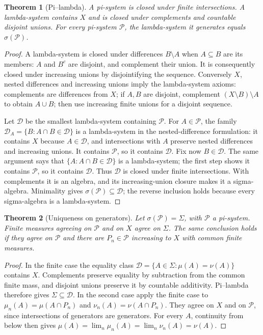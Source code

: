 \documentclass[11pt,oneside,openany]{book}
\newtheorem{theorem}{Theorem}[chapter]
\theoremstyle{definition}
\theoremstyle{remark}
\newcommand{\family}[1]{}
\begin{document}
\begin{theorem}[Pi--lambda]
\family{D11.01.pi_lambda}\label{d11:01:pi-lambda}
A pi-system is closed under finite intersections. A lambda-system contains
$X$ and is closed under complements and countable disjoint unions.
For every pi-system $\mathcal P$, the lambda-system it generates equals
$\sigma(\mathcal P)$.
\end{theorem}
\begin{proof}
A lambda-system is closed under differences $B\setminus A$ when $A\subseteq B$
are its members: $A$ and $B^c$ are disjoint, and complement their union.
It is consequently closed under increasing unions by disjointifying the
sequence. Conversely $X$, nested differences and increasing unions imply
the lambda-system axioms: complements are differences from $X$; if $A,B$
are disjoint, complement $(X\setminus B)\setminus A$ to obtain $A\cup B$;
then use increasing finite unions for a disjoint sequence.

Let $\mathcal D$ be the smallest lambda-system containing $\mathcal P$.
For $A\in\mathcal P$, the family
$\mathcal D_A=\{B:A\cap B\in\mathcal D\}$ is a lambda-system in the
nested-difference formulation: it contains $X$ because $A\in\mathcal D$,
and intersections with $A$ preserve nested differences and increasing unions.
It contains $\mathcal P$, so it contains $\mathcal D$. Fix now $B\in\mathcal D$.
The same argument says that $\{A:A\cap B\in\mathcal D\}$ is a lambda-system;
the first step shows it contains $\mathcal P$, so it contains $\mathcal D$.
Thus $\mathcal D$ is closed under finite intersections. With complements it
is an algebra, and its increasing-union closure makes it a sigma-algebra.
Minimality gives $\sigma(\mathcal P)\subseteq\mathcal D$; the reverse
inclusion holds because every sigma-algebra is a lambda-system.
\end{proof}

\begin{theorem}[Uniqueness on generators]
\family{D11.01.measure_uniqueness_generators}\label{d11:01:measure-uniqueness-generators}
Let $\sigma(\mathcal P)=\Sigma$, with $\mathcal P$ a pi-system. Finite
measures agreeing on $\mathcal P$ and on $X$ agree on $\Sigma$.
The same conclusion holds if they agree on $\mathcal P$ and there are
$P_n\in\mathcal P$ increasing to $X$ with common finite measures.
\end{theorem}
\begin{proof}
In the finite case the equality class
$\mathcal D=\{A\in\Sigma:\mu(A)=\nu(A)\}$ contains $X$. Complements
preserve equality by subtraction from the common finite mass, and disjoint
unions preserve it by countable additivity. Pi--lambda therefore gives
$\Sigma\subseteq\mathcal D$.
In the second case apply the finite case to
$\mu_n(A)=\mu(A\cap P_n)$ and $\nu_n(A)=\nu(A\cap P_n)$.
They agree on $X$ and on $\mathcal P$, since intersections of generators
are generators. For every $A$, continuity from below then gives
$\mu(A)=\lim_n\mu_n(A)=\lim_n\nu_n(A)=\nu(A)$.
\end{proof}
\end{document}
